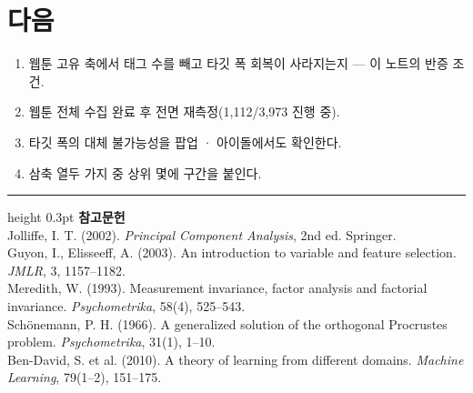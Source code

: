\documentclass[10pt]{article}
\begin{document}
\section{다음}

\begin{enumerate}[leftmargin=1.3em,itemsep=0.15em]
\item 웹툰 고유 축에서 태그 수를 빼고 타깃 폭 회복이 사라지는지 --- 이 노트의
      반증 조건.
\item 웹툰 전체 수집 완료 후 전면 재측정(1,112/3,973 진행 중).
\item 타깃 폭의 대체 불가능성을 팝업 · 아이돌에서도 확인한다.
\item 삼축 열두 가지 중 상위 몇에 구간을 붙인다.
\end{enumerate}

\vspace{0.6em}
\hrule height 0.3pt
\vspace{0.5em}
{\footnotesize
\textbf{참고문헌}\\[0.3em]
Jolliffe, I. T. (2002). \emph{Principal Component Analysis}, 2nd ed. Springer.\\[0.15em]
Guyon, I., Elisseeff, A. (2003). An introduction to variable and feature selection.
\emph{JMLR}, 3, 1157--1182.\\[0.15em]
Meredith, W. (1993). Measurement invariance, factor analysis and factorial
invariance. \emph{Psychometrika}, 58(4), 525--543.\\[0.15em]
Schönemann, P. H. (1966). A generalized solution of the orthogonal Procrustes
problem. \emph{Psychometrika}, 31(1), 1--10.\\[0.15em]
Ben-David, S. et al. (2010). A theory of learning from different domains.
\emph{Machine Learning}, 79(1--2), 151--175.
}
\end{document}
